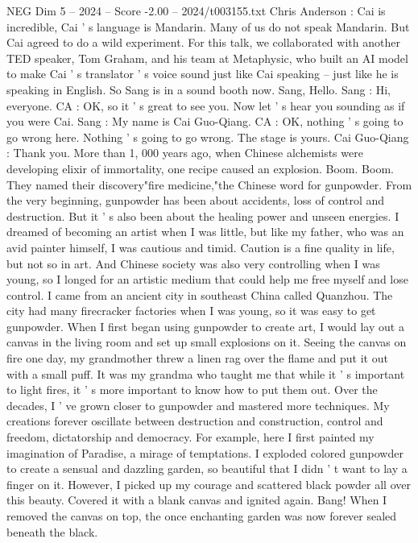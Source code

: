\begin{textsample}{NEG Dim 5 – 2024 – Score -2.00 – 2024/t003155.txt}  \label{ex:f5_neg_013}
Chris Anderson : Cai is incredible, Cai ' s language is Mandarin.
Many of us do not speak Mandarin.
But Cai agreed to do a wild experiment.
For this talk, we collaborated with another TED speaker, Tom Graham, and his team at Metaphysic, who built an AI model to make Cai ' s translator ' s voice sound just like Cai speaking -- just like he is speaking in English.
So Sang is in a sound booth now.
Sang, Hello.
Sang : Hi, everyone.
CA : OK, so it ' s great to see you.
Now let ' s hear you sounding as if you were Cai.
Sang : My name is Cai Guo-Qiang.
CA : OK, nothing ' s going to go wrong here.
Nothing ' s going to go wrong.
The stage is yours.
Cai Guo-Qiang : Thank you.
More than 1, 000 years ago, when Chinese alchemists were developing elixir of immortality, one recipe caused an explosion.
Boom.
Boom.
They named their discovery"fire medicine,"the Chinese word for gunpowder.
From the very beginning, gunpowder has been about accidents, loss of control and destruction.
But it ' s also been about the healing power and unseen energies.
I dreamed of becoming an artist when I was little, but like my father, who was an avid painter himself, I was cautious and timid.
Caution is a fine quality in life, but not so in art.
And Chinese society was also very controlling when I was young, so I longed for an artistic medium that could help me free myself and lose control.
I came from an ancient city in southeast China called Quanzhou.
The city had many firecracker factories when I was young, so it was easy to get gunpowder.
When I first began using gunpowder to create art, I would lay out a canvas in the living room and set up small explosions on it.
Seeing the canvas on fire one day, my grandmother threw a linen rag over the flame and put it out with a small puff.
It was my grandma who taught me that while it ' s important to light fires, it ' s more important to know how to put them out.
Over the decades, I ' ve grown closer to gunpowder and mastered more techniques.
My creations forever oscillate between destruction and construction, control and freedom, dictatorship and democracy.
For example, here I first painted my imagination of Paradise, a mirage of temptations.
I exploded colored gunpowder to create a sensual and dazzling garden, so beautiful that I didn ' t want to lay a finger on it.
However, I picked up my courage and scattered black powder all over this beauty.
Covered it with a blank canvas and ignited again.
Bang!
When I removed the canvas on top, the once enchanting garden was now forever sealed beneath the black.

\end{textsample}

